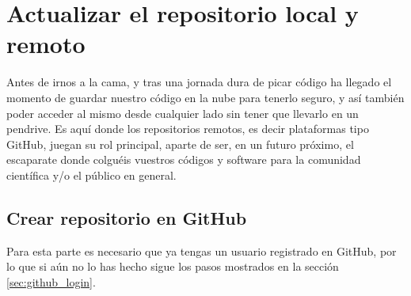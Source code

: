 \documentclass[a4paper,10pt]{article}
\begin{document}
  \section{Actualizar el repositorio  local y remoto}
    Antes de irnos a la cama, y tras una jornada dura de picar código ha llegado el momento de guardar nuestro código en la nube para tenerlo seguro, y así también poder acceder al mismo desde cualquier lado sin tener que llevarlo en un pendrive. Es aquí donde los repositorios remotos, es decir plataformas tipo GitHub, juegan su rol principal, aparte de ser, en un futuro próximo, el escaparate donde colguéis vuestros códigos y software para la comunidad científica y/o el público en general. 
    
    \subsection{Crear repositorio en GitHub}
      Para esta parte es necesario que ya tengas un usuario registrado en GitHub, por lo que si  aún no lo has hecho sigue los pasos mostrados en la sección \ref{sec:github_login}.
\end{document}
